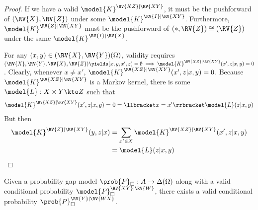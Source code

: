 \begin{proof}
If we have a valid $\model{K}^{\RV{XZ}|\RV{XY}}$, it must be the pushforward of $(\RV{X},\RV{Z})$ under some $\model{K}^{\RV{I}|\RV{XY}}$. Furthermore, $\model{K}^{\RV{Z}|\RV{XY}}$ must be the pushforward of $(*,\RV{Z})\cong (\RV{Z})$ under the same $\model{K}^{\RV{I}|\RV{X}}$.

For any $(x,y)\in (\RV{X},\RV{Y})(\Omega)$, validity requires $(\RV{X},\RV{Y},\RV{X},\RV{Z})\yields (x,y,x',z)=\emptyset \implies \model{K}^{\RV{XZ}|\RV{XY}}(x',z|x,y)=0$. Clearly, whenever $x\neq x'$, $\model{K}^{\RV{XZ}|\RV{XY}}(x',z|x,y)=0$. Because $\model{K}^{\RV{XZ}|\RV{XY}}$ is a Markov kernel, there is some $\model{L}:X\times Y\kto Z$ such that
\begin{align}
    \model{K}^{\RV{XZ}|\RV{XY}}(x',z|x,y)=0 = \llbracket x=x' \rrbracket \model{L}(z|x,y)\\
\end{align}
But then
\begin{align}
    \model{K}^{\RV{Z}|\RV{XY}}(y,z|x) &= \sum_{x'\in X} \model{K}^{\RV{XZ}|\RV{XY}}(x',z|x,y)\\
    &= \model{L}(z|x,y)\\
\end{align}
\end{proof}


\begin{theorem}\label{th:valid_disint}
Given a probability gap model $\prob{P}_\square:A\to \Delta(\Omega)$ along with a valid conditional probability $\model{P}_\square^{\RV{XY}|\RV{W}}$, there exists a valid conditional probability $\prob{P}_\square^{\RV{Y}|\RV{WX}}$.
\end{theorem}

